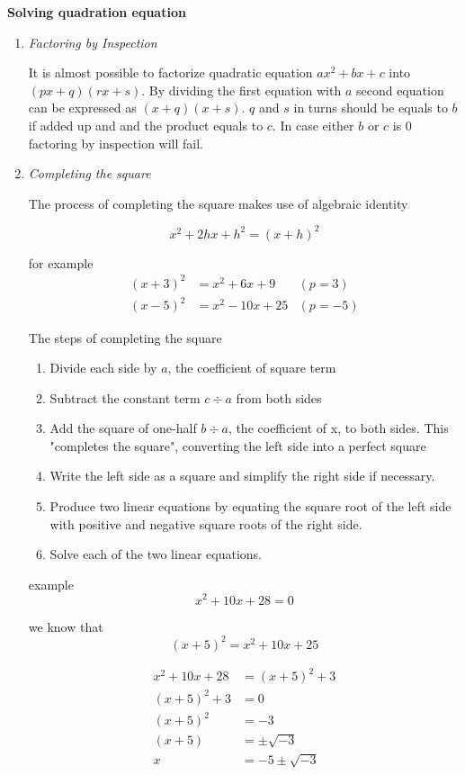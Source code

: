 \documentclass{article}
\begin{document}
\textbf{Solving quadration equation}
\begin{enumerate}

\item \textit{Factoring by Inspection}

It is almost possible to factorize quadratic equation $ax^2 + bx + c$ into
$(px + q)(rx + s)$. By dividing the first equation with $a$ second equation
can be expressed as $(x + q)(x + s)$. $q$ and $s$ in turns should be equals
to $b$ if added up and and the product equals to $c$. In case either $b$ or $c$
is $0$ factoring by inspection will fail.




\item \textit{Completing the square}

The process of completing the square makes use of algebraic identity

\[
x^2 + 2hx + h^2 = (x + h)^2
\]

for example 
\begin{align*}
(x + 3) ^2 &= x^2 + 6x + 9     &(p = 3)\\
(x - 5) ^2 &= x^2 - 10x + 25   &(p = -5)
\end{align*}

The steps of completing the square

\begin{enumerate}
\item Divide each side by $a$, the coefficient of square term
\item Subtract the constant term $c\div a$ from both sides
\item Add the square of one-half $b\div a$, the coefficient of x, to both sides.
This "completes the square", converting the left side into a perfect square
\item Write the left side as a square and simplify the right side if necessary.
\item Produce two linear equations by equating the square root of the left side
with positive and negative square roots of the right side.
\item Solve each of the two linear equations.
\end{enumerate}

example
\[
x^2 + 10x + 28 = 0
\]

we know that
\[
(x + 5)^2 = x^2 + 10x + 25
\]

\begin{align*}
x^2 + 10x + 28 &= (x + 5)^2 + 3\\
(x + 5)^2 + 3&= 0\\
(x + 5)^2 &= -3\\ 
(x + 5) &= \pm\sqrt{-3}\\
x  &= -5 \pm\sqrt{-3}
\end{align*}


\end{enumerate}
\end{document}

